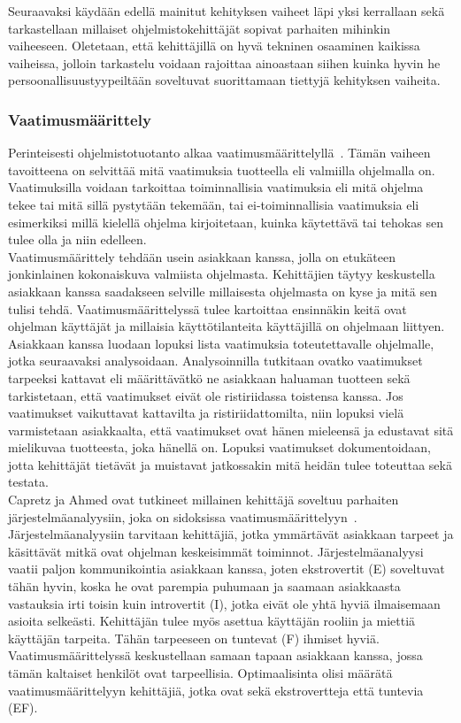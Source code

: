 \documentclass[finnish]{../tktltiki2}
\theoremstyle{definition}
\theoremstyle{remark}
\begin{document}
Seuraavaksi käydään edellä mainitut kehityksen vaiheet läpi yksi kerrallaan
sekä tarkastellaan millaiset ohjelmistokehittäjät sopivat
parhaiten mihinkin vaiheeseen. Oletetaan, että kehittäjillä on
hyvä tekninen osaaminen kaikissa vaiheissa, jolloin tarkastelu
voidaan rajoittaa ainoastaan siihen kuinka hyvin he persoonallisuustyypeiltään soveltuvat suorittamaan tiettyjä
kehityksen vaiheita.

\subsubsection{Vaatimusmäärittely}

Perinteisesti ohjelmistotuotanto alkaa vaatimusmäärittelyllä~\cite{SWEBOK:409902,Sommerville:2005:IRE:1042197.1042341}. Tämän vaiheen tavoitteena on selvittää mitä vaatimuksia
tuotteella eli valmiilla ohjelmalla on. Vaatimuksilla voidaan tarkoittaa toiminnallisia vaatimuksia eli
mitä ohjelma tekee tai mitä sillä pystytään tekemään, tai ei-toiminnallisia vaatimuksia eli esimerkiksi millä kielellä
ohjelma kirjoitetaan, kuinka käytettävä tai tehokas sen tulee olla ja niin edelleen.\\

Vaatimusmäärittely tehdään usein asiakkaan kanssa, jolla on etukäteen jonkinlainen kokonaiskuva valmiista ohjelmasta.
Kehittäjien täytyy keskustella asiakkaan kanssa saadakseen selville millaisesta ohjelmasta on kyse ja mitä sen tulisi tehdä.
Vaatimusmäärittelyssä tulee kartoittaa ensinnäkin keitä ovat ohjelman käyttäjät ja millaisia käyttötilanteita
käyttäjillä on ohjelmaan liittyen. Asiakkaan kanssa luodaan lopuksi lista vaatimuksia toteutettavalle ohjelmalle,
jotka seuraavaksi analysoidaan. Analysoinnilla tutkitaan ovatko vaatimukset tarpeeksi kattavat eli määrittävätkö ne asiakkaan
haluaman tuotteen sekä tarkistetaan, että vaatimukset eivät ole ristiriidassa toistensa kanssa. Jos vaatimukset vaikuttavat
kattavilta ja ristiriidattomilta, niin lopuksi vielä varmistetaan asiakkaalta, että vaatimukset ovat hänen mieleensä ja
edustavat sitä mielikuvaa tuotteesta, joka hänellä on.
Lopuksi vaatimukset dokumentoidaan, jotta kehittäjät tietävät ja muistavat jatkossakin mitä heidän tulee toteuttaa sekä testata.\\

Capretz ja Ahmed ovat tutkineet millainen kehittäjä soveltuu
parhaiten järjestelmäanalyysiin, joka on sidoksissa vaatimusmäärittelyyn~\cite{Capretz:2010:MSS:1726559.1726574}.
Järjestelmä\-analyysiin tarvitaan kehittäjiä, jotka ymmärtävät asiakkaan tarpeet ja käsittävät mitkä ovat ohjelman keskeisimmät toiminnot.
Järjestelmäa\-nalyysi vaatii paljon kommunikointia asiakkaan kanssa,
joten ekstrovertit (E) soveltuvat tähän hyvin, koska he ovat parempia
puhumaan ja saamaan asiakkaasta vastauksia irti toisin kuin introvertit (I), jotka eivät ole yhtä hyviä ilmaisemaan asioita selkeästi. 
Kehittäjän tulee myös asettua käyttäjän rooliin ja miettiä
käyttäjän tarpeita. Tähän tarpeeseen on tuntevat (F) ihmiset hyviä. Vaatimusmäärittelyssä keskustellaan samaan tapaan asiakkaan kanssa, jossa tämän kaltaiset henkilöt ovat tarpeellisia. Optimaalisinta olisi määrätä vaatimusmäärittelyyn kehittäjiä, jotka ovat sekä ekstrovertteja että tuntevia (EF).\\
\end{document}
